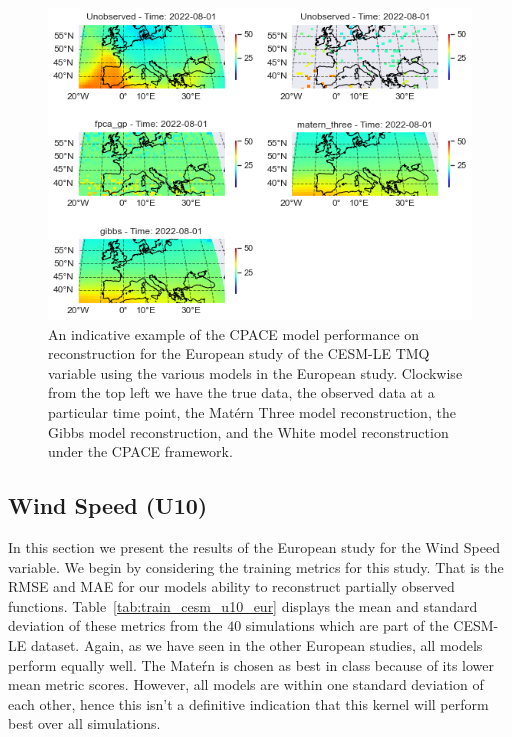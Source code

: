 \begin{figure}
	\centering
	\includegraphics[width=\textwidth]{full_ex_tmq_eur}
	\caption[An indicative example of the CPACE model performance on reconstruction for the European study of the CESM-LE TMQ variable using the various models in the European study.]{An indicative example of the CPACE model performance on reconstruction for the European study of the CESM-LE TMQ variable using the various models in the European study. Clockwise from the top left we have the true data, the observed data at a particular time point, the Mat\'ern Three model reconstruction, the Gibbs model reconstruction, and the White model reconstruction under the CPACE framework.}
	\label{fig:full_ex_tmq_eur}
\end{figure}

\subsection{Wind Speed (U10) \label{ssec:cesm_u10_eur}}
In this section we present the results of the European study for the Wind Speed variable. 
We begin by considering the training metrics for this study.
That is the RMSE and MAE for our models ability to reconstruct partially observed functions.
Table~\ref{tab:train_cesm_u10_eur} displays the mean and standard deviation of these metrics from the $40$ simulations which are part of the CESM-LE dataset. 
Again, as we have seen in the other European studies, all models perform equally well.
The Mate\'rn is chosen as best in class because of its lower mean metric scores.
However, all models are within one standard deviation of each other, hence this isn't a definitive indication that this kernel will perform best over all simulations.

